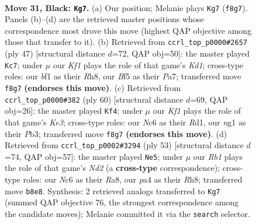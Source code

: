 \documentclass[11pt]{article}
\begin{document}
\clearpage

\begin{figure}[p]\centering
\begin{subfigure}{0.46\textwidth}\centering
\resizebox{\linewidth}{!}{%
\newchessgame
\chessboard[
  setfen={1r3k2/4rP2/ppn5/2p1pbp1/P7/2P2P2/1K4PP/2N1RBNR b - - 1 31},
  showmover=false,
  pgfstyle=straightmove, color=movearrow, markmove={f8-g7}
]}
\caption{}
\end{subfigure}\hfill
\begin{subfigure}{0.46\textwidth}\centering
\resizebox{\linewidth}{!}{%
\newchessgame
\chessboard[
  setfen={3kr2r/pp1n4/2p2pb1/P5pp/3PP3/2P2BP1/3N2P1/2K1R2R b - - 4 24},
  showmover=false,
  pgfstyle=straightmove, color=movearrow, markmove={d8-c7}
]}
\caption{}
\end{subfigure}
\\[4pt]
\begin{subfigure}{0.46\textwidth}\centering
\resizebox{\linewidth}{!}{%
\newchessgame
\chessboard[
  setfen={2nr1k2/1b1r1p2/pp4p1/2pP4/P5Pp/1PNBKP1P/3R4/3R4 w - - 4 31},
  showmover=false,
  pgfstyle=straightmove, color=movearrow, markmove={e3-f4}
]}
\caption{}
\end{subfigure}\hfill
\begin{subfigure}{0.46\textwidth}\centering
\resizebox{\linewidth}{!}{%
\newchessgame
\chessboard[
  setfen={r6r/3n2pp/2pn1k2/3p1P2/pP5P/2P2N2/1PK5/R4B1R b - - 0 27},
  showmover=false,
  pgfstyle=straightmove, color=movearrow, markmove={d7-e5}
]}
\caption{}
\end{subfigure}
\caption{\textbf{Move 31, Black: \texttt{Kg7}.} (a) Our position; Melanie plays \texttt{Kg7} (\texttt{f8g7}). Panels (b)--(d) are the retrieved master positions whose correspondence most drove this move (highest QAP objective among those that transfer to it). (b) Retrieved from \texttt{ccrl\_top\_p0000\#2657} (ply 47) [structural distance $d$=72, QAP obj=50]: the master played \texttt{Kc7}; under $\mu$ our \emph{Kf1} plays the role of that game's \emph{Kd1}; cross-type roles: our \emph{b}f1 as their \emph{R}h8, our \emph{B}f5 as their \emph{P}a7; transferred move \texttt{f8g7} \textbf{(endorses this move)}. (c) Retrieved from \texttt{ccrl\_top\_p0000\#382} (ply 60) [structural distance $d$=69, QAP obj=26]: the master played \texttt{Kf4}; under $\mu$ our \emph{Kf1} plays the role of that game's \emph{Ke3}; cross-type roles: our \emph{N}c6 as their \emph{R}d1, our \emph{n}g1 as their \emph{P}b3; transferred move \texttt{f8g7} \textbf{(endorses this move)}. (d) Retrieved from \texttt{ccrl\_top\_p0002\#3294} (ply 53) [structural distance $d$=74, QAP obj=57]: the master played \texttt{Ne5}; under $\mu$ our \emph{Rb1} plays the role of that game's \emph{Nd2} (a \textbf{cross-type} correspondence); cross-type roles: our \emph{N}c6 as their \emph{R}a8, our \emph{p}a4 as their \emph{R}h8; transferred move \texttt{b8e8}. Synthesis: 2 retrieved analogs transferred to \texttt{Kg7} (summed QAP objective 76, the strongest correspondence among the candidate moves); Melanie committed it via the \texttt{search} selector.}
\label{fig:thought-m61}
\end{figure}
\end{document}
